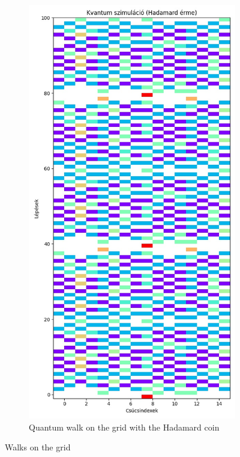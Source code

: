 \begin{figure}[H]
\begin{subfigure}{.45\linewidth}
  \end{subfigure}
  \begin{subfigure}{.45\linewidth}
    \centering
    \includegraphics[width=\linewidth]{./figures/results/grid/hadamard.jpg}
    \caption{Quantum walk on the grid with the Hadamard coin}
  \end{subfigure}
  \caption{Walks on the grid}
\end{figure}

